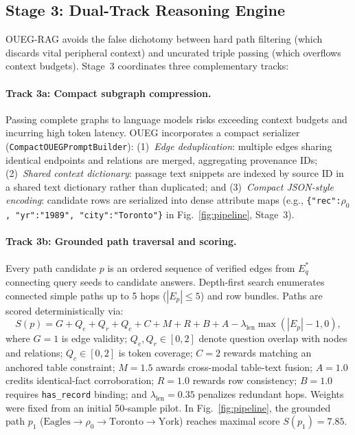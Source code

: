 \subsection{Stage 3: Dual-Track Reasoning Engine}
\label{sec:method-engine}
\label{sec:method-oueg}
OUEG-RAG avoids the false dichotomy between hard path filtering (which discards vital peripheral context) and uncurated triple passing (which overflows context budgets). Stage~3 coordinates three complementary tracks:

\paragraph{Track 3a: Compact subgraph compression.}
Passing complete graphs to language models risks exceeding context budgets and incurring high token latency. OUEG incorporates a compact serializer (\texttt{CompactOUEGPromptBuilder}): (1)~\emph{Edge deduplication}: multiple edges sharing identical endpoints and relations are merged, aggregating provenance IDs; (2)~\emph{Shared context dictionary}: passage text snippets are indexed by source ID in a shared text dictionary rather than duplicated; and (3)~\emph{Compact JSON-style encoding}: candidate rows are serialized into dense attribute maps (e.g., \texttt{\{"rec":$\rho_0$, "yr":"1989", "city":"Toronto"\}} in Fig.~\ref{fig:pipeline}, Stage~3).

\paragraph{Track 3b: Grounded path traversal and scoring.}
\label{sec:method-paths}
Every path candidate $p$ is an ordered sequence of verified edges from $E_q^*$ connecting query seeds to candidate answers. Depth-first search enumerates connected simple paths up to 5 hops ($|E_p| \le 5$) and row bundles. Paths are scored deterministically via:
\begin{equation}
\label{eq:path-score}
S(p) = G + Q_e + Q_r + Q_c + C + M + R + B + A - \lambda_{\text{len}} \max(|E_p|-1, 0),
\end{equation}
where $G=1$ is edge validity; $Q_e, Q_r \in [0, 2]$ denote question overlap with nodes and relations; $Q_c \in [0, 2]$ is token coverage; $C=2$ rewards matching an anchored table constraint; $M=1.5$ awards cross-modal table-text fusion; $A=1.0$ credits identical-fact corroboration; $R=1.0$ rewards row consistency; $B=1.0$ requires \texttt{has\_record} binding; and $\lambda_{\text{len}}=0.35$ penalizes redundant hops. Weights were fixed from an initial 50-sample pilot. In Fig.~\ref{fig:pipeline}, the grounded path $p_1$ ($\text{Eagles} \rightarrow \rho_0 \rightarrow \text{Toronto} \rightarrow \text{York}$) reaches maximal score $S(p_1) = 7.85$.

